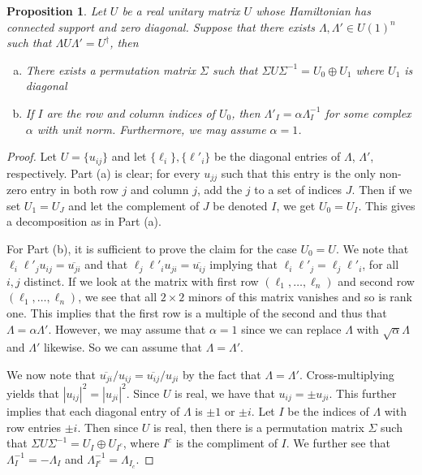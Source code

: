 \documentclass[twocolumn,superscriptaddress]{revtex4-1}
\theoremstyle{plain}
\newtheorem{proposition}[theorem]{Proposition}
\theoremstyle{definition}
\theoremstyle{definition}
\theoremstyle{definition}
\theoremstyle{definition}
\theoremstyle{definition}
\theoremstyle{definition}
\begin{document}
\begin{proposition}\label{prop:decomp}
 Let $U$ be a real unitary matrix $U$ whose Hamiltonian has connected support and zero diagonal. Suppose that there exists $\Lambda,\Lambda'\in U(1)^n$ such that $\Lambda U\Lambda'=U^\dagger$, then
 \begin{enumerate}[(a)]
  \item There exists a permutation matrix $\Sigma$ such that $\Sigma U\Sigma^{-1}=U_0\oplus U_1$ where $U_1$ is diagonal
  \item If $I$ are the row and column indices of $U_0$, then $\Lambda'_I=\alpha \Lambda_I^{-1}$ for some complex $\alpha$ with unit norm. Furthermore, we may assume $\alpha=1$.
 \end{enumerate}
\end{proposition}
\begin{proof}
 Let $U=\{u_{ij}\}$ and let $\{\ell_i\}, \{\ell'_i\}$ be the diagonal entries of $\Lambda$, $\Lambda'$, respectively. Part (a) is clear; for every $u_{jj}$ such that this entry is the only non-zero entry in both row $j$ and column $j$, add the $j$ to a set of indices $J$. Then if we set $U_1=U_J$ and let the complement of $J$ be denoted $I$, we get $U_0=U_I$. This gives a decomposition as in Part (a). 
 
 For Part (b), it is sufficient to prove the claim for the case $U_0=U$. We note that $\ell_i\ell'_ju_{ij}=\overline{u_{ji}}$ and that $\ell_j\ell'_iu_{ji}=\overline{u_{ij}}$ implying that $\ell_i\ell'_j=\ell_j\ell'_i$, for all $i,j$ distinct. If we look at the matrix with first row $(\ell_1,\dots,\ell_n)$ and second row $(\ell_1,\dots,\ell_n)$, we see that all $2\times 2 $ minors of this matrix vanishes and so is rank one. This implies that the first row is a multiple of the second and thus that $\Lambda=\alpha \Lambda'$. However, we may assume that $\alpha=1$ since we can replace $\Lambda$ with $\sqrt{\alpha}\Lambda$ and $\Lambda'$ likewise. So we can assume that $\Lambda=\Lambda'$.
 
 We now note that $\overline{u_{ji}}/u_{ij}=\overline{u_{ij}}/u_{ji}$ by the fact that $\Lambda=\Lambda'$. Cross-multiplying yields that $|u_{ij}|^2=|u_{ji}|^2$. Since $U$ is real, we have that $u_{ij}=\pm u_{ji}$. This further implies that each diagonal entry of $\Lambda$ is $\pm 1$ or $\pm i$. Let $I$ be the indices of $\Lambda$ with row entries $\pm i$. Then since $U$ is real, then there is a permutation matrix $\Sigma$ such that $\Sigma U\Sigma^{-1}=U_I\oplus U_{I^c}$, where $I^c$ is the compliment of $I$. We further see that $\Lambda_I^{-1}=-\Lambda_I$ and $\Lambda_{I^c}^{-1}=\Lambda_{I_c}$.


\end{proof}
\end{document}
